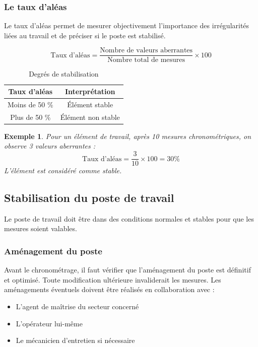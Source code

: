 \documentclass[a4paper,12pt]{article}
\newtheorem{exemple}{Exemple}[section]
\begin{document}
\subsubsection{Le taux d'aléas}

Le taux d'aléas permet de mesurer objectivement l'importance des irrégularités liées au travail et de préciser si le poste est stabilisé.

\[
\text{Taux d'aléas} = \frac{\text{Nombre de valeurs aberrantes}}{\text{Nombre total de mesures}} \times 100
\]

\begin{table}[ht]
\centering
\begin{tabular}{|c|c|}
\hline
\textbf{Taux d'aléas} & \textbf{Interprétation} \\
\hline
Moins de 50 \% & Élément stable \\
Plus de 50 \% & Élément non stable \\
\hline
\end{tabular}
\caption{Degrés de stabilisation}
\end{table}

\begin{exemple}
Pour un élément de travail, après 10 mesures chronométriques, on observe 3 valeurs aberrantes :
\[
\text{Taux d'aléas} = \frac{3}{10} \times 100 = 30\%
\]
L'élément est considéré comme stable.
\end{exemple}

\subsection{Stabilisation du poste de travail}

Le poste de travail doit être dans des conditions normales et stables pour que les mesures soient valables.

\subsubsection{Aménagement du poste}

Avant le chronométrage, il faut vérifier que l'aménagement du poste est définitif et optimisé. Toute modification ultérieure invaliderait les mesures. Les aménagements éventuels doivent être réalisés en collaboration avec :
\begin{itemize}
    \item L'agent de maîtrise du secteur concerné
    \item L'opérateur lui-même
    \item Le mécanicien d'entretien si nécessaire
\end{itemize}
\end{document}
